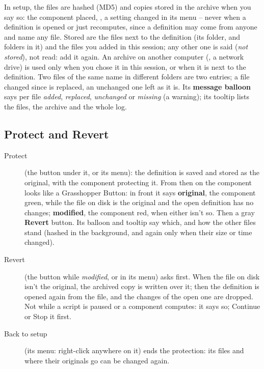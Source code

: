 In setup, the files are hashed (MD5) and copies stored in the archive when you say so: the component placed,
, a setting changed in its menu -- never when a definition is opened or just recomputes, since a definition
may come from anyone and name any file. Stored are the files next to the definition (its folder, and folders in it) and the
files you added in this session; any other one is said (\emph{not stored}), not read: add it again. An archive on another
computer (, a network drive) is used only when you chose it in
this session, or when it is next to the definition. Two files of the same name in different folders are two entries; a
file changed since is replaced, an unchanged one left as it is. Its \textbf{message balloon} says per file \emph{added},
\emph{replaced}, \emph{unchanged} or \emph{missing} (a warning); its tooltip lists the files, the archive and the whole log.

\subsection{Protect and Revert}

\begin{description}
  \item[Protect] (the button under it, or its menu): the definition is saved and stored as the original, with the component
        protecting it. From then on the component looks like a Grasshopper Button: in front it says \textbf{original}, the
        component \textcolor{mvgreen}{green}, while the file on disk is the original and the open definition has no changes;
        \textbf{modified}, the component \textcolor{mvred}{red}, when either isn't so. Then a gray \textbf{Revert} button. Its
        balloon and tooltip say which, and how the other files stand (hashed in the background, and again only when their
        size or time changed).
  \item[Revert] (the button while \emph{modified}, or  in its menu) asks first. When the file
        on disk isn't the original, the archived copy is written over it; then the definition is opened again from the
        file, and the changes of the open one are dropped. Not while a script is paused or a component computes: it says
        so; Continue or Stop it first.
  \item[Back to setup] (its menu: right-click anywhere on it) ends the protection: its files and where their originals
        go can be changed again.
\end{description}

